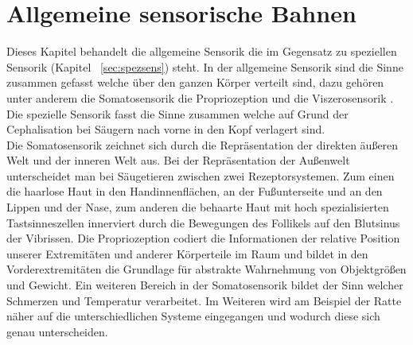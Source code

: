 \documentclass[12pt,a4paper,pdftex]{article}
\begin{document}
\section{Allgemeine sensorische Bahnen}
Dieses Kapitel behandelt die allgemeine Sensorik  die im Gegensatz zu speziellen Sensorik (Kapitel~ \ref{sec:spezsens}) steht. In der allgemeine Sensorik sind die Sinne zusammen gefasst welche über den ganzen Körper verteilt sind, dazu gehören unter anderem die Somatosensorik  die Propriozeption  und die Viszerosensorik \cite[Kap. 22]{kandel2013principles}. Die spezielle Sensorik  fasst die Sinne zusammen welche auf Grund der Cephalisation bei Säugern nach vorne in den Kopf verlagert sind.
\\
Die Somatosensorik zeichnet sich durch die Repräsentation der direkten äußeren Welt und der inneren Welt aus. Bei der Repräsentation der Außenwelt unterscheidet man bei Säugetieren zwischen zwei Rezeptorsystemen. Zum einen die haarlose Haut in den Handinnenflächen, an der Fußunterseite und an den Lippen und der Nase, zum anderen die behaarte Haut mit hoch spezialisierten Tastsinneszellen innerviert durch die Bewegungen des Follikels auf den Blutsinus  der Vibrissen.   \cite{paxinos2014rat}
Die Propriozeption codiert die Informationen der relative Position unserer Extremitäten und anderer Körperteile im Raum und bildet in den Vorderextremitäten die Grundlage für abstrakte Wahrnehmung von Objektgrößen und Gewicht. Ein weiteren Bereich in der Somatosensorik bildet der Sinn welcher Schmerzen und Temperatur verarbeitet. \cite{paxinos2014rat}
Im Weiteren wird am Beispiel der Ratte näher auf die unterschiedlichen Systeme eingegangen und wodurch diese sich genau unterscheiden. 
\end{document}
